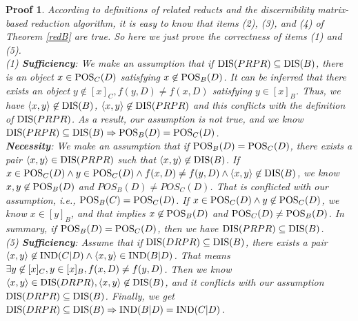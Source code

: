 \documentclass[review]{elsarticle}
\newtheorem*{myPrf}{Proof}
\begin{document}
		\begin{myPrf}
			According to definitions of related reducts and the discernibility matrix-based reduction algorithm, it is easy to know that items {\rm(2)}, {\rm(3)}, and {\rm(4)} of Theorem \ref{redB} are true. So here we just prove the correctness of items {\rm(1)} and {\rm(5)}. \\
			\rm(1) \textbf{Sufficiency}: We make an assumption that if ${\rm DIS}(PRPR) \subseteq {\rm DIS}(B)$, there is an object $ x \in {\rm POS}_C(D)$ satisfying $x \not \in {\rm POS}_B(D)$. It can be inferred that there exists an object $y \not \in [x]_C, f(y,D) \neq f(x,D)$ satisfying $y \in [x]_B$. Thus, we have $\langle x,y \rangle \not \in {\rm DIS}(B)$, $\langle x,y\rangle \not \in {\rm DIS}(PRPR)$ and this conflicts with the definition of ${\rm DIS}(PRPR)$. As a result, our assumption is not true, and we know ${\rm DIS}(PRPR) \subseteq {\rm DIS}(B) \Rightarrow {\rm POS}_B(D)={\rm POS}_C(D)$.\\
			\textbf{Necessity}: We make an assumption that if ${\rm POS}_B(D)={\rm POS}_C(D)$, there exists a pair $\langle x,y\rangle  \in {\rm DIS}(PRPR)$ such that $\langle x,y\rangle \not \in {\rm DIS}(B)$. If $x \in {\rm POS}_C(D) \wedge y \in {\rm POS}_C(D) \wedge f(x,D)\neq f(y,D) \wedge \langle x,y \rangle \not \in {\rm DIS}(B)$, we know $x,y \not \in {\rm POS}_B(D)$ and $POS_B(D) \neq POS_C(D)$. That is conflicted with our assumption, \emph{i.e.}, ${\rm POS}_B(C)={\rm POS}_C(D)$. If $x \in {\rm POS}_C(D) \wedge y \not \in {\rm POS}_C(D)$, we know $x \in [y]_B$, and that implies $x\not \in {\rm POS}_B(D)$ and ${\rm POS}_C(D) \neq {\rm POS}_B(D)$. In summary, if ${\rm POS}_B(D)={\rm POS}_C(D)$, then we have ${\rm DIS}(PRPR) \subseteq {\rm DIS}(B)$. \\
			{\rm(5)} \textbf{Sufficiency}: Assume that if ${\rm DIS}(DRPR) \subseteq {\rm DIS}(B)$, there exists a pair $ \langle x,y\rangle  \not \in {\rm IND}(C|D) \wedge \langle x,y\rangle \in {\rm IND}(B|D)$. That means $\exists y \not \in [x]_C, y\in [x]_B,f(x,D)\\ \neq f(y,D)$. Then we know $\langle x,y\rangle  \in {\rm DIS}(DRPR), \langle x,y\rangle \not \in {\rm DIS}(B)$, and it conflicts with our assumption ${\rm DIS}(DRPR) \subseteq {\rm DIS}(B)$. Finally, we get ${\rm DIS}(DRPR) \subseteq {\rm DIS}(B) \Rightarrow {\rm IND}(B|D) = {\rm IND}(C|D)$.\\

\end{myPrf}
\end{document}
